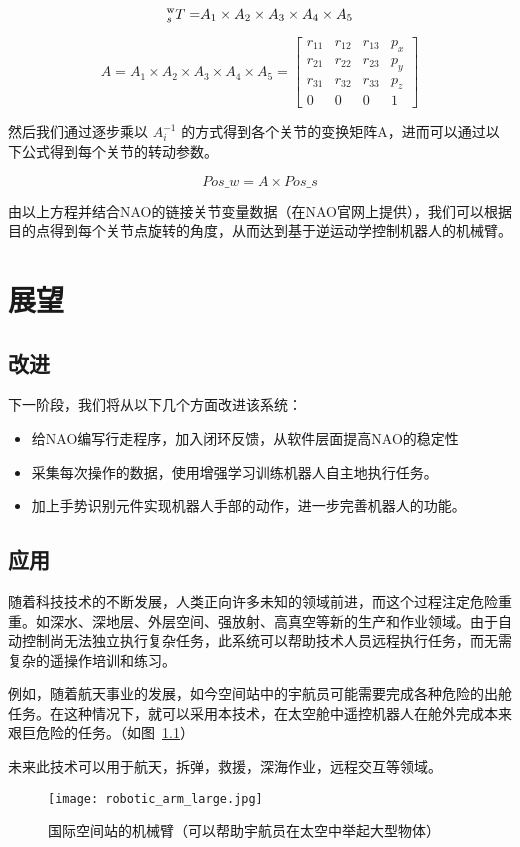 \begin{equation}
{}_{s}^{\rm{w}}{T = }{{A}_{1}} \times {{A}_{2}} \times {{A}_{3}} \times {{A}_{4}} \times {{A}_{5}}
\end{equation}

\begin{equation}
	A = {A_1} \times {A_2} \times {A_3} \times {A_4} \times {A_5} = \left[ {\begin{array}{*{20}{c}}
		{{r_{11}}}&{{r_{12}}}&{{r_{13}}}&{{p_x}}\\
		{{r_{21}}}&{{r_{22}}}&{{r_{23}}}&{{p_y}}\\
		{{r_{31}}}&{{r_{32}}}&{{r_{33}}}&{{p_z}}\\
		0&0&0&1
		\end{array}} \right]
\end{equation}

然后我们通过逐步乘以 $ A_i^{-1} $ 的方式得到各个关节的变换矩阵A，进而可以通过以下公式得到每个关节的转动参数。

\begin{equation}
{Pos\_w = A} \times {Pos\_s}
\end{equation}

由以上方程并结合NAO的链接关节变量数据（在NAO官网上提供），我们可以根据目的点得到每个关节点旋转的角度，从而达到基于逆运动学控制机器人的机械臂。


\chapter{展望}

\section{改进}
下一阶段，我们将从以下几个方面改进该系统：
\begin{itemize}
    \item 给NAO编写行走程序，加入闭环反馈，从软件层面提高NAO的稳定性
    \item 采集每次操作的数据，使用增强学习训练机器人自主地执行任务。
    \item 加上手势识别元件实现机器人手部的动作，进一步完善机器人的功能。
\end{itemize}

\section{应用}

随着科技技术的不断发展，人类正向许多未知的领域前进，而这个过程注定危险重重。如深水、深地层、外层空间、强放射、高真空等新的生产和作业领域。由于自动控制尚无法独立执行复杂任务，此系统可以帮助技术人员远程执行任务，而无需复杂的遥操作培训和练习。

例如，随着航天事业的发展，如今空间站中的宇航员可能需要完成各种危险的出舱任务。在这种情况下，就可以采用本技术，在太空舱中遥控机器人在舱外完成本来艰巨危险的任务。（如图~\ref{arm}）

未来此技术可以用于航天，拆弹，救援，深海作业，远程交互等领域。

\begin{figure}[htbp]
\small
\centering
\texttt{[image: robotic\_arm\_large.jpg]}
\caption{国际空间站的机械臂（可以帮助宇航员在太空中举起大型物体）} 
\label{arm}
\end{figure}

